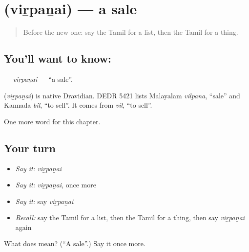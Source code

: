\section[\texorpdfstring{\ta{விற்பனை} (viṟpaṉai)}{விற்பனை (viṟpaṉai)}]{ (viṟpaṉai) — a sale}

\label{lesson:TA-C251-virpanai}



\begin{quote}
Before the new one: say the Tamil for a list, then the Tamil for a thing.
\end{quote}

\subsection*{You'll want to know: }
\textbf{} — \emph{viṟpaṉai} — \textquotedblleft{}a sale\textquotedblright{}.

\begin{cousinweb}
\textbf{} (\emph{viṟpaṉai}) is native Dravidian. DEDR 5421 lists Malayalam \emph{vilpana}, \textquotedblleft{}sale\textquotedblright{} and Kannada \emph{bil}, \textquotedblleft{}to sell\textquotedblright{}. It comes from \emph{vil}, \textquotedblleft{}to sell\textquotedblright{}.
\end{cousinweb}

\begin{grammarlens}[title={What you've built}]
One more word for this chapter.
\end{grammarlens}

\subsection*{Your turn}
\begin{itemize}
\raggedright
  \item \emph{Say it:} \emph{viṟpaṉai}
  \item \emph{Say it:} \emph{viṟpaṉai}, once more
  \item \emph{Say it:} say \emph{viṟpaṉai}
  \item \emph{Recall:} say the Tamil for a list, then the Tamil for a thing, then say \emph{viṟpaṉai} again
\end{itemize}

\begin{tcolorbox}[breakable,colback=teal!4,colframe=teal!35!black,title={Before you move on}]
What does  mean? (\textquotedblleft{}A sale\textquotedblright{}.) Say it once more.
\end{tcolorbox}
